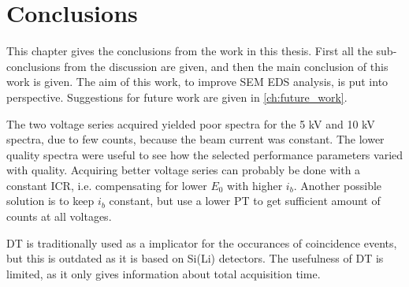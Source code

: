 \chapter{Conclusions}
\label{ch:conclusion}

This chapter gives the conclusions from the work in this thesis. 
First all the sub-conclusions from the discussion are given, and then the main conclusion of this work is given.
The aim of this work, to improve SEM EDS analysis, is put into perspective.
Suggestions for future work are given in \cref{ch:future_work}.











The two voltage series acquired yielded poor spectra for the 5 kV and 10 kV spectra, due to few counts, because the beam current was constant.
The lower quality spectra were useful to see how the selected performance parameters varied with quality.
Acquiring better voltage series can probably be done with a constant ICR, i.e. compensating for lower $E_0$ with higher $i_b$.
Another possible solution is to keep $i_b$ constant, but use a lower PT to get sufficient amount of counts at all voltages.

DT is traditionally used as a implicator for the occurances of coincidence events, but this is outdated as it is based on Si(Li) detectors.
The usefulness of DT is limited, as it only gives information about total acquisition time.

